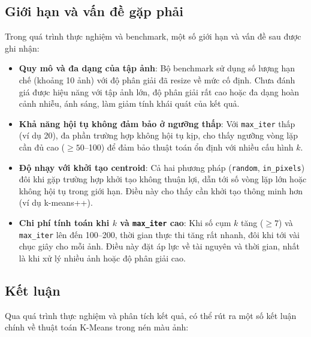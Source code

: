 \subsection{Giới hạn và vấn đề gặp phải}

Trong quá trình thực nghiệm và benchmark, một số giới hạn và vấn đề sau được ghi nhận:

\begin{itemize}
  \item \textbf{Quy mô và đa dạng của tập ảnh}: Bộ benchmark sử dụng số lượng hạn chế (khoảng 10 ảnh) với độ phân giải đã resize về mức cố định. Chưa đánh giá được hiệu năng với tập ảnh lớn, độ phân giải rất cao hoặc đa dạng hoàn cảnh nhiễu, ánh sáng, làm giảm tính khái quát của kết quả.
  \item \textbf{Khả năng hội tụ không đảm bảo ở ngưỡng thấp}: Với \texttt{max\_iter} thấp (ví dụ 20), đa phần trường hợp không hội tụ kịp, cho thấy ngưỡng vòng lặp cần đủ cao (\(\geq50\)–100) để đảm bảo thuật toán ổn định với nhiều cấu hình \(k\).
  \item \textbf{Độ nhạy với khởi tạo centroid}: Cả hai phương pháp (\texttt{random}, \texttt{in\_pixels}) đôi khi gặp trường hợp khởi tạo không thuận lợi, dẫn tới số vòng lặp lớn hoặc không hội tụ trong giới hạn. Điều này cho thấy cần khởi tạo thông minh hơn (ví dụ k-means++).
  \item \textbf{Chi phí tính toán khi \(k\) và \texttt{max\_iter} cao}: Khi số cụm \(k\) tăng (\(\geq 7\)) và \texttt{max\_iter} lên đến 100–200, thời gian thực thi tăng rất nhanh, đôi khi tới vài chục giây cho mỗi ảnh. Điều này đặt áp lực về tài nguyên và thời gian, nhất là khi xử lý nhiều ảnh hoặc độ phân giải cao.
\end{itemize}

\subsection{Kết luận}

Qua quá trình thực nghiệm và phân tích kết quả, có thể rút ra một số kết luận chính về thuật toán K-Means trong nén màu ảnh:

